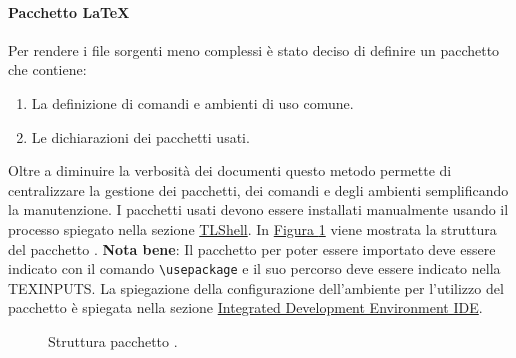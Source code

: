 \paragraph{Pacchetto LaTeX}
Per rendere i file sorgenti meno complessi è stato deciso di definire un pacchetto  che contiene:
\begin{enumerate}
    \item La definizione di comandi e ambienti di uso comune.
    \item Le dichiarazioni dei pacchetti usati.
\end{enumerate}
Oltre a diminuire la verbosità dei documenti questo metodo permette di centralizzare la gestione dei pacchetti, dei comandi e degli ambienti semplificando la manutenzione.
I pacchetti usati devono essere installati manualmente usando il processo spiegato nella sezione \hyperref[subpar:TLShell]{TLShell}.
In \hyperref[fig:pacchetto_latex]{Figura \ref{fig:pacchetto_latex}} viene mostrata la struttura del pacchetto .
\textbf{Nota bene}: Il pacchetto per poter essere importato deve essere indicato con il comando \lstinline|\usepackage| e il suo percorso deve essere indicato nella  TEXINPUTS.
La spiegazione della configurazione dell'ambiente per l'utilizzo del pacchetto è spiegata nella sezione \hyperref[par:IDE]{Integrated Development Environment IDE}.
\begin{figure}[H]
    \caption{Struttura pacchetto .}
    \label{fig:pacchetto_latex}
\end{figure}

